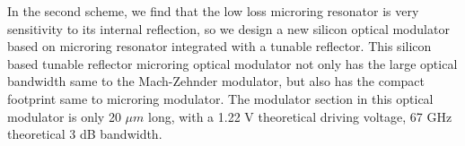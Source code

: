 \begin{englishabstract}
In the second scheme, we find that the low loss microring resonator is very sensitivity to its internal reflection, so we design a new silicon optical modulator based on microring resonator integrated with a tunable reflector. This silicon based tunable reflector microring optical modulator not only has the large optical bandwidth same to the Mach-Zehnder modulator, but also has the compact footprint same to microring modulator. The modulator section in this optical modulator is only 20 $\mu m$ long, with a 1.22 V theoretical driving voltage, 67 GHz theoretical 3 dB bandwidth.



\end{englishabstract}
